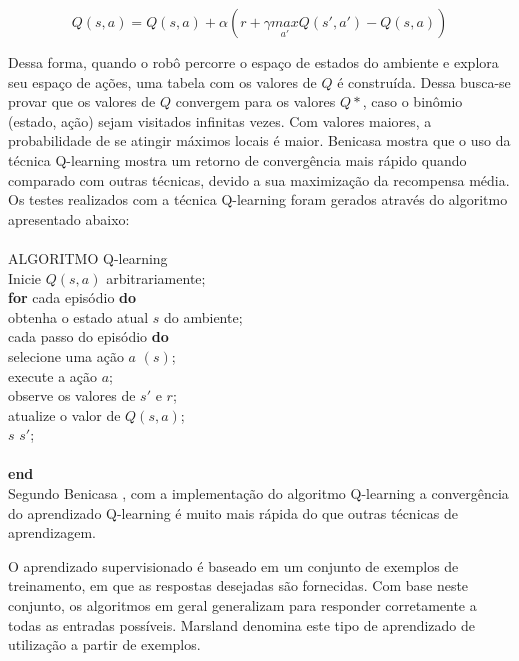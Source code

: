 \begin{equation} \label{eq:qlearning}
Q(s,a)=Q(s,a) + \alpha (r+\gamma  \underset{a'}{max} Q(s', a')-Q(s,a)) 	
\end{equation}

Dessa forma, quando o robô percorre o espaço de estados do ambiente e explora seu espaço de ações, uma tabela com os valores de $Q$ é construída. Dessa busca-se provar que os valores de $Q$ convergem para os valores $Q*$, caso o binômio (estado, ação) sejam visitados infinitas vezes. Com valores maiores, a probabilidade de se atingir máximos locais é maior. Benicasa \cite{ben:12} mostra  que o uso da técnica Q-learning mostra um retorno de convergência mais rápido quando comparado com outras técnicas, devido a sua maximização da recompensa média. Os testes realizados com a técnica Q-learning foram gerados através do algoritmo apresentado abaixo:\\

\hline\hline\\
\vspace*{0.2cm}
\noindent ALGORITMO Q-learning
\vspace*{0.2cm}
\hline\hline\\
\vspace*{0.5cm}
\noindent Inicie $Q(s,a)$ arbitrariamente;\\
{\bf for} cada episódio {\bf do}\\
\indent obtenha o estado atual $s$ do ambiente;\\
 cada passo do episódio {\bf do}\\
\indent \indent selecione uma ação $a$  $(s)$;\\

\indent \indent execute a ação $a$;\\
\indent \indent observe os valores de $s'$ e $r$;\\
\indent \indent atualize o valor de $Q(s,a)$;\\
\indent \indent $s$ \leftarrow $s'$;\\
\\
{\bf end}\\
 
Segundo Benicasa \cite{ben:12}, com a implementação do algoritmo Q-learning a convergência do aprendizado Q-learning é muito mais rápida do que outras técnicas de aprendizagem.

O aprendizado supervisionado é baseado em um conjunto de exemplos de treinamento, em que as respostas desejadas são fornecidas. Com base neste conjunto, os algoritmos em geral generalizam para responder corretamente a todas as entradas possíveis. Marsland \cite{mar:09} denomina este tipo de aprendizado de utilização a partir de exemplos.

